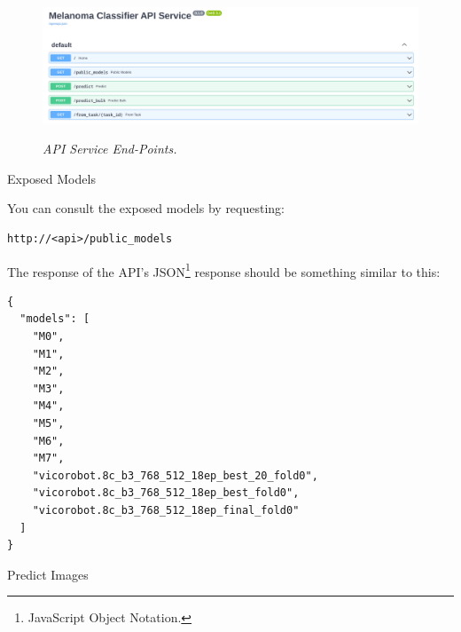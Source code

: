 \documentclass[dvipsnames,mathserif]{beamer}
\begin{document}
{\begin{frame}[fragile]
      \begin{figure}[H]
        \centering
        \begin{adjustbox}{width=0.8\textwidth, trim={0cm 0cm 0.1cm 0cm}, clip}
          \includegraphics[width=\textwidth]{images/api-endpoints.png}
        \end{adjustbox}
        \caption[API Service End-Points]{\textit{API Service End-Points. }}
        {\label{fig:api-endpoints}}
      \end{figure}
    \end{frame}



    \begin{frame}[fragile]
      \large Exposed Models

      \vspace{0.25cm}
      \footnotesize
      You can consult the exposed models by requesting:

      \vspace{0.1cm}

      \begin{Verbatim}[fontsize=\tiny]
http://<api>/public_models
      \end{Verbatim}

      The response of the API's JSON\footnote{JavaScript Object Notation.}
      response should be something similar to this:

      \vspace{0.1cm}

      \begin{Verbatim}[fontsize=\tiny]
{
  "models": [
    "M0",
    "M1",
    "M2",
    "M3",
    "M4",
    "M5",
    "M6",
    "M7",
    "vicorobot.8c_b3_768_512_18ep_best_20_fold0",
    "vicorobot.8c_b3_768_512_18ep_best_fold0",
    "vicorobot.8c_b3_768_512_18ep_final_fold0"
  ]
}
      \end{Verbatim}

    \end{frame}


    \begin{frame}[fragile]
      \large Predict Images


\end{frame}}
\end{document}
